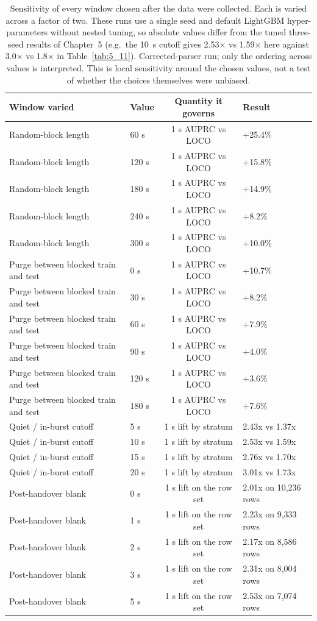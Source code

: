 \begin{table}[htbp]
\centering
\caption{Sensitivity of every window chosen after the data were collected. Each is varied across a factor of two. These runs use a single seed and default LightGBM hyper-parameters without nested tuning, so absolute values differ from the tuned three-seed results of Chapter~5 (e.g.\ the 10~s cutoff gives 2.53$\times$ vs 1.59$\times$ here against 3.0$\times$ vs 1.8$\times$ in Table~\ref{tab:5_11}). Corrected-parser run; only the ordering across values is interpreted. This is local sensitivity around the chosen values, not a test of whether the choices themselves were unbiased.}
\label{tab:A_5}
\vspace{0.4em}
\singlespacing
\small
\begin{tabularx}{\linewidth}{p{3.5cm} p{2.8cm} c X}
\toprule
\textbf{Window varied} & \textbf{Value} & \textbf{Quantity it governs} & \textbf{Result} \\
\midrule
Random-block length & 60 s & 1 s AUPRC vs LOCO & +25.4\% \\
Random-block length & 120 s & 1 s AUPRC vs LOCO & +15.8\% \\
Random-block length & 180 s & 1 s AUPRC vs LOCO & +14.9\% \\
Random-block length & 240 s & 1 s AUPRC vs LOCO & +8.2\% \\
Random-block length & 300 s & 1 s AUPRC vs LOCO & +10.0\% \\
Purge between blocked train and test & 0 s & 1 s AUPRC vs LOCO & +10.7\% \\
Purge between blocked train and test & 30 s & 1 s AUPRC vs LOCO & +8.2\% \\
Purge between blocked train and test & 60 s & 1 s AUPRC vs LOCO & +7.9\% \\
Purge between blocked train and test & 90 s & 1 s AUPRC vs LOCO & +4.0\% \\
Purge between blocked train and test & 120 s & 1 s AUPRC vs LOCO & +3.6\% \\
Purge between blocked train and test & 180 s & 1 s AUPRC vs LOCO & +7.6\% \\
Quiet / in-burst cutoff & 5 s & 1 s lift by stratum & 2.43x vs 1.37x \\
Quiet / in-burst cutoff & 10 s & 1 s lift by stratum & 2.53x vs 1.59x \\
Quiet / in-burst cutoff & 15 s & 1 s lift by stratum & 2.76x vs 1.70x \\
Quiet / in-burst cutoff & 20 s & 1 s lift by stratum & 3.01x vs 1.73x \\
Post-handover blank & 0 s & 1 s lift on the row set & 2.01x on 10,236 rows \\
Post-handover blank & 1 s & 1 s lift on the row set & 2.23x on 9,333 rows \\
Post-handover blank & 2 s & 1 s lift on the row set & 2.17x on 8,586 rows \\
Post-handover blank & 3 s & 1 s lift on the row set & 2.31x on 8,004 rows \\
Post-handover blank & 5 s & 1 s lift on the row set & 2.53x on 7,074 rows \\
\bottomrule
\end{tabularx}
\end{table}


